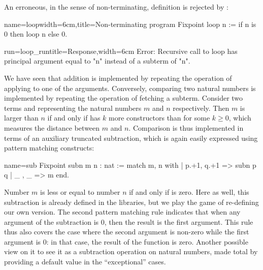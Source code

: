 
An erroneous, in the sense of non-terminating,
definition is rejected by \Coq{}:

\begin{coq-left}{name=loop}{width=6cm,title=Non-terminating program}
Fixpoint loop n :=
 if n is 0 then loop n else 0.
$~$
\end{coq-left}
\begin{coqout-right}{run=loop_run}{title=Response,width=6cm}
Error: Recursive call to loop has
principal argument equal to "n"
instead of a subterm of "n".
\end{coqout-right}

%
%

We have seen that addition is implemented by repeating the operation
of applying  to one of the arguments. Conversely, comparing two
natural numbers is implemented by repeating the operation of fetching a
subterm. Consider two terms  and  representing the natural
numbers $m$ and $n$ respectively. Then $m$ is larger than $n$ if and only
if  has $k$ more constructors than  for some $k \geq
0$, which measures the distance between $m$ and $n$. Comparison is
thus implemented in terms of an auxiliary
truncated subtraction, which is again easily expressed using pattern
matching constructs:

\begin{coq}{name=sub}{}
Fixpoint subn m n : nat :=
  match m, n with
  | p.+1, q.+1 => subn p q
  | _ , _ => m
  end.
\end{coq}
Number $m$ is less or equal to number $n$ if and only if  is
zero. Here as well, this subtraction is already defined in the
libraries, but we play the game of re-defining our own version.
The second pattern matching rule indicates that when
any argument of the subtraction is 0, then the result is
the first argument.  This %
rule thus also covers the case where the
second argument is non-zero while the first argument is 0: in that
case, the result of the function is zero.  Another possible view on
 it to see it as a subtraction operation on natural numbers,
made total by providing a default value in the ``exceptional'' cases.

